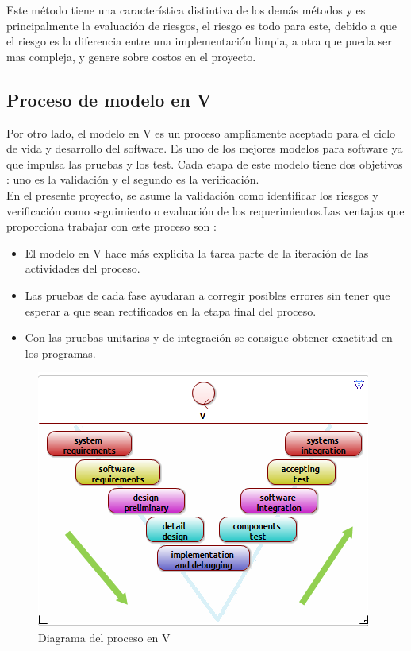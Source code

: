 Este método tiene una característica distintiva de los demás métodos y es principalmente la evaluación de riesgos, el riesgo es todo para este, debido a que el riesgo es la diferencia entre una implementación limpia, a otra que pueda ser mas compleja, y genere sobre costos en el proyecto.
\newpage 
\subsection{Proceso de modelo en V}
Por otro lado, el modelo en V es un proceso ampliamente aceptado para el ciclo de vida y desarrollo del software. Es uno de los mejores modelos para software ya que impulsa las pruebas y los test. Cada etapa de este modelo tiene dos objetivos : uno es la validación y el segundo es la verificación. \cite{7062536}
\\
En el presente proyecto, se asume la validación como identificar
los  riesgos y verificación como seguimiento o evaluación de los requerimientos.Las ventajas que proporciona trabajar con este proceso son : 

\begin{itemize}
	\item El modelo en V hace más explicita la tarea parte de la iteración de las actividades del proceso.
	\item Las pruebas de cada fase ayudaran a corregir posibles errores sin tener que esperar a que sean rectificados en la etapa final del proceso.
	\item Con las pruebas unitarias y de integración se consigue obtener exactitud en los programas.
\end{itemize}

\begin{figure}[h!]
	\centering
	\includegraphics[width=0.7\linewidth]{proyecto/imgs/modeloV}
	\caption{Diagrama del proceso en V}
	\label{fig:modelov}
\end{figure}


